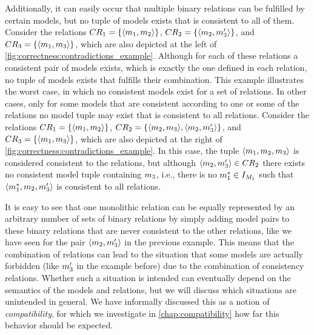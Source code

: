 Additionally, it can easily occur that multiple binary relations can be fulfilled by certain models, but no tuple of models exists that is consistent to all of them. Consider the relations $\consistencyrelation{CR}{1} = \setted{\tupled{\model{m}{1}, \model{m}{2}}}$, $\consistencyrelation{CR}{2} = \setted{\tupled{\model{m}{2}, \model{m}{3}'}}$, and $\consistencyrelation{CR}{3} = \setted{\tupled{\model{m}{1}, \model{m}{3}}}$, which are also depicted at the left of \autoref{fig:correctness:contradictions_example}.
Although for each of these relations a consistent pair of models exists, which is exactly the one defined in each relation, no tuple of models exists that fulfills their combination.
This example illustrates the worst case, in which no consistent models exist for a set of relations.
In other cases, only for some models that are consistent according to one or some of the relations no model tuple may exist that is consistent to all relations.
Consider the relations $\consistencyrelation{CR}{1} = \setted{\tupled{\model{m}{1}, \model{m}{2}}}$, $\consistencyrelation{CR}{2} = \setted{\tupled{\model{m}{2}, \model{m}{3}}, \tupled{\model{m}{2}, \model{m}{3}'}}$, and $\consistencyrelation{CR}{3} = \setted{\tupled{\model{m}{1}, \model{m}{3}}}$, which are also depicted at the right of \autoref{fig:correctness:contradictions_example}.
In this case, the tuple $\tupled{\model{m}{1}, \model{m}{2}, \model{m}{3}}$ is considered consistent to the relations, but although $\tupled{\model{m}{2}, \model{m}{3}'} \in \consistencyrelation{CR}{2}$ there exists no consistent model tuple containing $\model{m}{3}$, i.e., there is no $\model{m}{1}^* \in \metamodelinstanceset{M}{1}$ such that $\tupled{\model{m}{1}^*, \model{m}{2}, \model{m}{3}'}$ is consistent to all relations.

It is easy to see that one monolithic relation can be equally represented by an arbitrary number of sets of binary relations by simply adding model pairs to these binary relations that are never consistent to the other relations, like we have seen for the pair $\tupled{\model{m}{2}, \model{m}{3}'}$ in the previous example.
This means that the combination of relations can lead to the situation that some models are actually forbidden (like $\model{m}{3}'$ in the example before) due to the combination of consistency relations.
Whether such a situation is intended can eventually depend on the semantics of the models and relations, but we will discuss which situations are unintended in general.
We have informally discussed this as a notion of \emph{compatibility}, for which we investigate in \autoref{chap:compatibility} how far this behavior should be expected.


